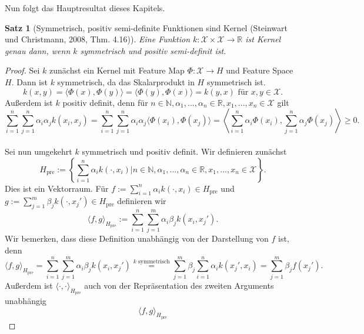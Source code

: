 \documentclass{article}
\theoremstyle{plain}
\newtheorem{thm}{Satz}[subsection]
\theoremstyle{definition}
\begin{document}
    Nun folgt das Hauptresultat dieses Kapitels.
    
    \begin{thm}[Symmetrisch, positiv semi-definite Funktionen sind Kernel (Steinwart und Christmann, 2008, \cite{svm} Thm. 4.16)] \label{mercer}
        Eine Funktion ${k: \mathcal{X} \times \mathcal{X} \to \mathbb{R}}$ ist Kernel genau dann, wenn $k$ symmetrisch und positiv semi-definit ist.
    \end{thm}
    \begin{proof}
        Sei $k$ zunächst ein Kernel mit Feature Map $\Phi: \mathcal{X} \to H$ und Feature Space $H$. Dann ist $k$ symmetrisch, da das Skalarprodukt in $H$ symmetrisch ist.
        \[
            k(x,y) = \langle \Phi(x), \Phi(y) \rangle = \langle \Phi(y), \Phi(x) \rangle = k(y,x) \text{ für } x,y \in \mathcal{X}.
        \]
        Außerdem ist $k$ positiv definit, denn für $n \in \mathbb{N}, \alpha_1,...,\alpha_n \in \mathbb{R}, x_1,...,x_n \in \mathcal{X}$ gilt
        \[
            \sum_{i=1}^{n} \sum_{j=1}^{n} \alpha_{i} \alpha_{j} k(x_i,x_j) 
            = \sum_{i=1}^{n} \sum_{j=1}^{n} \alpha_{i} \alpha_{j} \langle \Phi(x_i), \Phi(x_j) \rangle 
            = \left\langle \sum_{i=1}^{n} \alpha_{i} \Phi(x_i), \sum_{j=1}^{n} \alpha_{j} \Phi(x_j) \right\rangle 
            \geq 0.
        \]
        \\
        Sei nun umgekehrt $k$ symmetrisch und positiv definit. Wir definieren zunächst
        \[
            H_{\text{pre}} := \left\{\sum_{i=1}^{n} \alpha_{i} k(\cdot, x_{i}) \mathrel{\Big|} n \in \mathbb{N}, \alpha_{1},...,\alpha_{n} \in \mathbb{R}, x_{1},...,x_{n} \in \mathcal{X} \right\}.
        \]
        Dies ist ein Vektorraum. Für $f := \sum_{i=1}^{n} \alpha_{i} k(\cdot,x_{i}) \in H_{\text{pre}}$ und $g := \sum_{j=1}^{m} \beta_{j} k(\cdot, x_{j}') \in H_{\text{pre}}$ definieren wir
        \[
            \langle f, g \rangle_{H_{\text{pre}}} := \sum_{i=1}^{n} \sum_{j=1}^{m} \alpha_{i} \beta_{j} k(x_{i},x_{j}').
        \]
        Wir bemerken, dass diese Definition unabhängig von der Darstellung von $f$ ist, denn
        \[
            \langle f, g \rangle_{H_{\text{pre}}} 
            = \sum_{i=1}^{n} \sum_{j=1}^{m} \alpha_{i} \beta_{j} k(x_{i},x_{j}')
            \overset{\text{$k$ symmetrisch}}{=} \sum_{j=1}^{m} \beta_{j} \sum_{i=1}^{n} \alpha_{i} k(x_{j}',x_{i})
            = \sum_{j=1}^{m} \beta_{j} f(x_{j}').
        \]
        Außerdem ist $\langle \cdot, \cdot \rangle_{H_{\text{pre}}}$ auch von der Repräsentation des zweiten Arguments unabhängig
        \[
            \langle f, g \rangle_{H_{\text{pre}}} 
\]
\end{proof}
\end{document}
